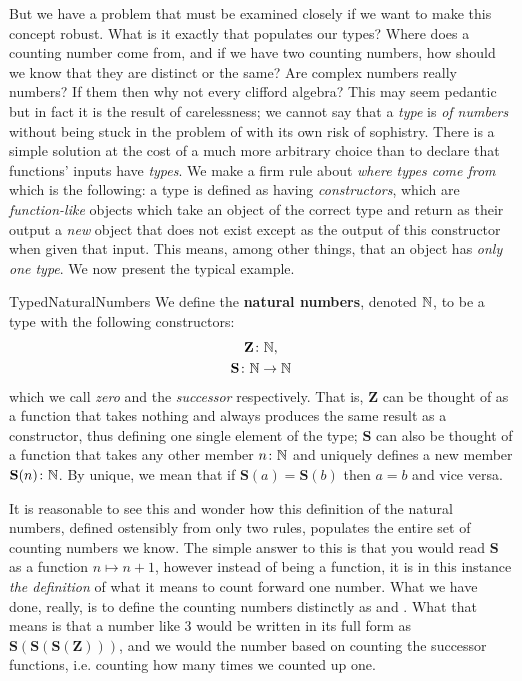 \documentclass[11pt]{article}
\begin{document}
But we have a problem that must be examined closely if we want to make this concept robust. What is it exactly that populates our types? Where does a counting number come from, and if we have two counting numbers, how should we know that they are distinct or the same? Are complex numbers really numbers? If them then why not every clifford algebra? This may seem pedantic but in fact it is the result of carelessness; we cannot say that a \emph{type} is \emph{of numbers} without being stuck in the problem of  with its own risk of sophistry. There is a simple solution at the cost of a much more arbitrary choice than to declare that functions' inputs have \emph{types}. We make a firm rule about \emph{where types come from} which is the following: a type is defined as having \emph{constructors}, which are \emph{function-like} objects which take an object of the correct type and return as their output a \emph{new} object that does not exist except as the output of this constructor when given that input. This means, among other things, that an object has \emph{only one type}. We now present the typical example.

\begin{label definition}{TypedNaturalNumbers}
We define the \textbf{natural numbers}, denoted $\mathbb{N}$, to be a type with the following constructors:\begin{gather*}
   \mathbf{Z}\colon \mathbb{N}, \\
   \mathbf{S}\colon \mathbb{N} \to \mathbb{N}
\end{gather*}
which we call \emph{zero} and the \emph{successor} respectively. That is, $\mathbf{Z}$ can be thought of as a function that takes nothing and always produces the same result as a constructor, thus defining one single element of the type; $\mathbf{S}$ can also be thought of a function that takes any other member $n \colon \mathbb{N}$ and uniquely defines a new member $\mathbf{S}(n) \colon \mathbb{N}$. By unique, we mean that if $\mathbf{S}(a) = \mathbf{S}(b)$ then $a = b$ and vice versa.
\end{label definition}

It is reasonable to see this and wonder how this definition of the natural numbers, defined ostensibly from only two rules, populates the entire set of counting numbers we know. The simple answer to this is that you would read $\mathbf{S}$ as a function $n \mapsto n + 1$, however instead of being a function, it is in this instance \emph{the definition} of what it means to count forward one number. What we have done, really, is to define the counting numbers distinctly as  and . What that means is that a number like $3$ would be written in its full form as $\mathbf{S}(\mathbf{S}(\mathbf{S}(\mathbf{Z})))$, and we would  the number based on counting the successor functions, i.e. counting how many times we counted up one.
\end{document}

